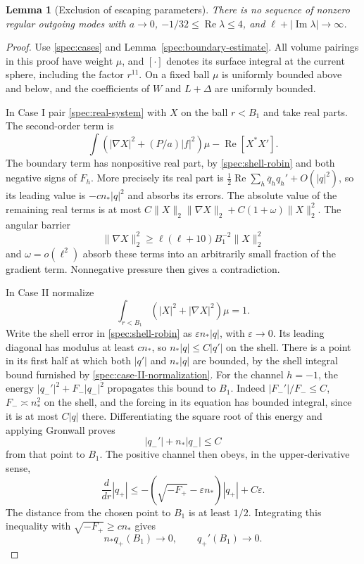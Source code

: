 \documentclass[11pt]{article}
\numberwithin{equation}{section}
\newtheorem{lemma}[theorem]{Lemma}
\theoremstyle{definition}
\theoremstyle{remark}
\begin{document}
\begin{lemma}[Exclusion of escaping parameters]\label{spec:high-exclusion}
There is no sequence of nonzero regular outgoing modes with $a\to0$,
$-1/32\le\operatorname{Re}\lambda\le4$, and
$\ell+|\operatorname{Im}\lambda|\to\infty$.
\end{lemma}

\begin{proof}
Use \eqref{spec:cases} and Lemma~\ref{spec:boundary-estimate}.
All volume pairings in this proof have weight $\mu$, and $[\cdot]$
denotes its surface integral at the current sphere, including the
factor $r^{11}$. On a fixed ball $\mu$ is uniformly bounded above and
below, and the coefficients of $W$ and $L+\Delta$ are uniformly
bounded.

In Case I pair \eqref{spec:real-system} with $X$ on the ball $r<B_1$
and take real parts. The second-order term is
\[
 \int(|\nabla X|^2+(P/a)|f|^2)\mu-\operatorname{Re}[X^*X'].
\]
The boundary term has nonpositive real part, by
\eqref{spec:shell-robin} and both negative signs of $F_h$.
More precisely its real part is
$\frac12\operatorname{Re}\sum_h\overline q_hq_h'+O(|q|^2)$, so its
leading value is $-c n_*|q|^2$ and absorbs its errors.
The absolute value of the remaining real terms is at most
$C\|X\|_2\|\nabla X\|_2+C(1+\omega)\|X\|_2^2$.
The angular barrier
\[
 \|\nabla X\|_2^2\ge
 \ell(\ell+10)B_1^{-2}\|X\|_2^2
\]
and $\omega=o(\ell^2)$ absorb these terms into an arbitrarily small
fraction of the gradient term. Nonnegative pressure then gives a
contradiction.

In Case II normalize
\begin{equation}\label{spec:case-II-normalization}
 \int_{r<B_1}(|X|^2+|\nabla X|^2)\mu=1.
\end{equation}
Write the shell error in \eqref{spec:shell-robin} as
$\varepsilon n_*|q|$, with $\varepsilon\to0$. Its leading diagonal
has modulus at least $c n_*$, so $n_*|q|\le C|q'|$ on the shell.
There is a point in its first half at which both $|q'|$ and
$n_*|q|$ are bounded, by the shell integral bound furnished by
\eqref{spec:case-II-normalization}.
For the channel $h=-1$, the energy
$|q_-'|^2+F_-|q_-|^2$ propagates this bound to $B_1$.
Indeed $|F_-'|/F_-\le C$, $F_-\asymp n_*^2$ on the shell, and the
forcing in its equation has bounded integral, since it is at most
$C|q|$ there. Differentiating the square root of this energy and
applying Gronwall proves
\[
 |q_-'|+n_*|q_-|\le C
\]
from that point to $B_1$.
The positive channel then obeys, in the upper-derivative sense,
\[
 \frac{d}{dr}|q_+|
 \le-(\sqrt{-F_+}-\varepsilon n_*)|q_+|+C\varepsilon.
\]
The distance from the chosen point to $B_1$ is at least $1/2$.
Integrating this inequality with $\sqrt{-F_+}\ge c n_*$ gives
\begin{equation}\label{spec:plus-vanishing}
 n_*q_+(B_1)\longrightarrow0,\qquad q_+'(B_1)\longrightarrow0.
\end{equation}


\end{proof}
\end{document}
